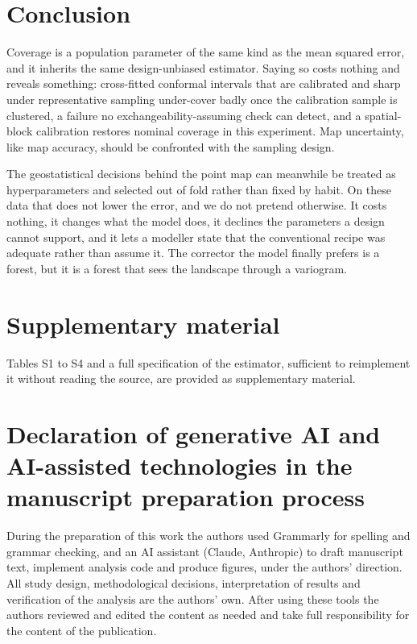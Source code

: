 \documentclass[preprint,12pt,authoryear]{elsarticle}
\begin{document}
\section{Conclusion}

Coverage is a population parameter of the same kind as the mean squared error,
and it inherits the same design-unbiased estimator. Saying so costs nothing and
reveals something: cross-fitted conformal intervals that are calibrated and
sharp under representative sampling under-cover badly once the calibration
sample is clustered, a failure no exchangeability-assuming check can detect, and
a spatial-block calibration restores nominal coverage in this experiment. Map
uncertainty, like map accuracy, should be confronted with the sampling design.

The geostatistical decisions behind the point map can meanwhile be treated as
hyperparameters and selected out of fold rather than fixed by habit. On these
data that does not lower the error, and we do not pretend otherwise. It costs
nothing, it changes what the model does, it declines the parameters a design
cannot support, and it lets a modeller state that the conventional recipe was
adequate rather than assume it. The corrector the model finally prefers is a
forest, but it is a forest that sees the landscape through a variogram.


\section*{Supplementary material}

Tables S1 to S4 and a full specification of the estimator, sufficient to
reimplement it without reading the source, are provided as supplementary
material.

\section*{Declaration of generative AI and AI-assisted technologies in the
manuscript preparation process}

During the preparation of this work the authors used Grammarly for spelling and
grammar checking, and an AI assistant (Claude, Anthropic) to draft manuscript
text, implement analysis code and produce figures, under the authors' direction.
All study design, methodological decisions, interpretation of results and
verification of the analysis are the authors' own. After using these tools the
authors reviewed and edited the content as needed and take full responsibility
for the content of the publication.
\end{document}
